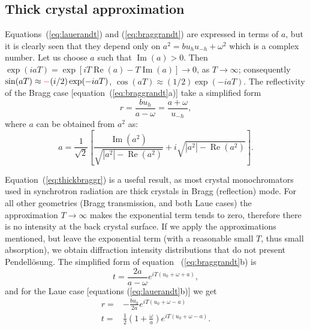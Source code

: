 \documentclass[preprint]{iucr}              %
\newcommand{\inblue}[1]{{\color{blue}#1}}
\newcommand{\inred}[1]{{\color{red}#1}}
\begin{document}
\inblue{
\subsection{Thick crystal approximation}\label{sec:thick}
}

\inblue{
Equations~(\ref{eq:lauerandt}) and (\ref{eq:braggrandt}) are expressed in terms of $a$, but it is clearly seen that they depend only on $a^2=bu_h u_{-h}+\omega^2$ which is a complex number. Let us choose $a$ such that $\operatorname{Im}(a)>0$. Then  
$\exp(iaT)=\exp[iT\operatorname{Re}(a)-T\operatorname{Im}(a)]\rightarrow 0$, as $T\rightarrow \infty$; consequently $\sin(aT)\approx \inred{-}(i/2) \exp(-i a T)$, $\cos(aT)\approx (1/2) \exp(-i a T)$. The reflectivity of the Bragg case [equation~(\ref{eq:braggrandt}a)] take a simplified form
\begin{equation}\label{eq:thickbraggr}
    r = \frac{b u_h}{a-\omega} = \frac{a+\omega}{u_{-h}},
\end{equation}
where $a$ can be obtained from $a^2$ as: 
\begin{equation}
a = \frac{1}{\sqrt{2}} \left[ \frac{\operatorname{Im}(a^2)}{\sqrt{|a^2|-\operatorname{Re}(a^2)}} + i \sqrt{|a^2|-\operatorname{Re}(a^2)} \right].
\end{equation}

Equation~(\ref{eq:thickbraggr}) is a useful result, as most crystal monochromators used in synchrotron radiation are thick crystals in Bragg (reflection) mode. For all other geometries (Bragg transmission, and both Laue cases) the approximation $T\rightarrow \infty$ makes the exponential term tends to zero, therefore there is no intensity at the back crystal surface. If we apply the approximations mentioned, but leave the exponential term (with a reasonable small $T$, thus small absorption), we obtain diffraction intensity distributions that do not present Pendell\"osung. The simplified form of equation~ (\ref{eq:braggrandt}b) is   
\begin{equation}\label{eq:thickbraggt}
    t = \frac{2a}{a-\omega} e^{i T (u_0+\omega+a)},
\end{equation}
and for the Laue case [equations (\ref{eq:lauerandt}b)] we get
\begin{subequations}
\label{eq:thicklaue}
\begin{align}
r = & - \frac{b u_h}{2 a} e^{iT (u_0+\omega-a)}  \\
t = & \frac{1}{2} (1 + \frac{\omega}{a})e^{i T (u_0+\omega-a)}.
\end{align}
\end{subequations}
}
\end{document}
